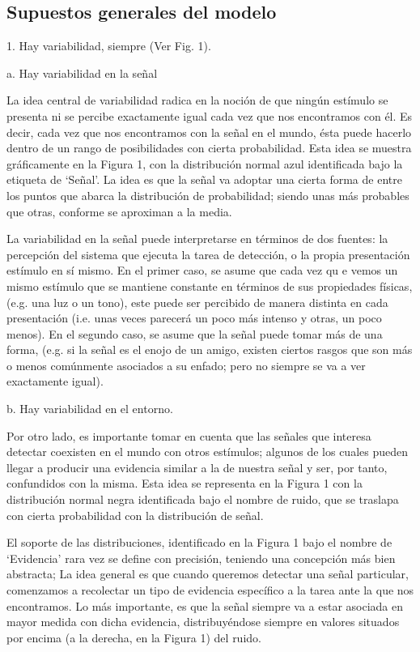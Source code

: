 \subsection{Supuestos generales del modelo}


1.	Hay variabilidad, siempre (Ver Fig. 1).

a.	Hay variabilidad en la señal

La idea central de variabilidad radica en la noción de que ningún estímulo se presenta ni se percibe exactamente igual cada vez que nos encontramos con él.  Es decir, cada vez que nos encontramos con la  señal en el mundo, ésta puede hacerlo dentro de un rango de posibilidades con cierta probabilidad. Esta idea se muestra gráficamente en la Figura 1, con la distribución normal azul identificada bajo la etiqueta de ‘Señal’. La idea es que la señal va adoptar una cierta forma de entre los puntos que abarca la distribución de probabilidad; siendo unas más probables que otras, conforme se aproximan a la media.

La variabilidad en la señal puede interpretarse en términos de dos fuentes: la percepción del sistema que ejecuta la tarea de detección, o la propia presentación estímulo en sí mismo. En el primer caso, se asume que cada vez qu e vemos un mismo estímulo que se mantiene constante en términos de sus propiedades físicas,  (e.g. una luz o un tono),  este puede ser percibido de manera distinta en cada presentación (i.e. unas veces parecerá un poco más intenso y otras, un poco menos). En el segundo caso, se asume que la señal puede tomar más de una forma, (e.g. si la señal es el enojo de un amigo, existen ciertos rasgos que son más o menos comúnmente asociados a su enfado; pero no siempre se va a ver exactamente igual).

b.	Hay variabilidad en el entorno.

Por otro lado, es importante tomar en cuenta que las señales que interesa detectar coexisten en el mundo con otros estímulos; algunos de los cuales pueden llegar a producir una evidencia similar a la de nuestra señal y ser, por tanto, confundidos con la misma. Esta idea se representa en la Figura 1 con la distribución normal negra identificada bajo el nombre de ruido, que se traslapa con cierta probabilidad con la distribución de señal.


El soporte de las distribuciones, identificado en la Figura 1 bajo el nombre de ‘Evidencia’ rara vez se define con precisión,  teniendo una concepción más bien abstracta; La idea general es que cuando queremos detectar una señal particular, comenzamos a recolectar un tipo de evidencia específico a la tarea ante la que nos encontramos. Lo más importante, es que la señal siempre va a estar asociada en mayor medida con dicha evidencia, distribuyéndose siempre en valores situados por encima (a la derecha, en la Figura 1) del ruido.


